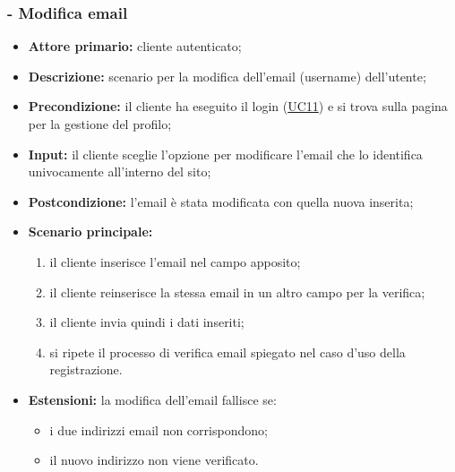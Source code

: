 \subsubsection{ - Modifica email}
\begin{itemize}
    \item \textbf{Attore primario:} cliente autenticato;
    \item \textbf{Descrizione:} scenario per la modifica dell'email (username) dell'utente;
    \item \textbf{Precondizione:} il cliente ha eseguito il login (\hyperref[UC11]{UC11}) e si trova sulla pagina per la gestione del profilo;
    \item \textbf{Input:} il cliente sceglie l'opzione per modificare l'email che lo identifica univocamente all'interno del sito;
    \item \textbf{Postcondizione:} l'email è stata modificata con quella nuova inserita;
    \item \textbf{Scenario principale:}
          \begin{enumerate}
              \item il cliente inserisce l'email nel campo apposito;
              \item il cliente reinserisce la stessa email in un altro campo per la verifica;
              \item il cliente invia quindi i dati inseriti;
              \item si ripete il processo di verifica email spiegato nel caso d'uso della registrazione.
          \end{enumerate}
    \item \textbf{Estensioni:} la modifica dell'email fallisce se:
          \begin{itemize}
              \item i due indirizzi email non corrispondono;
              \item il nuovo indirizzo non viene verificato.
          \end{itemize}
\end{itemize}

\stepsubUserCase
